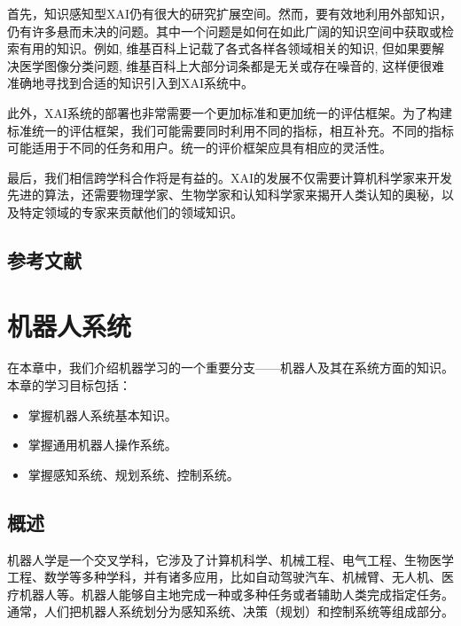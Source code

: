 \documentclass[letterpaper,10pt,english]{sphinxmanual}
\begin{document}
\sphinxAtStartPar
首先，知识感知型XAI仍有很大的研究扩展空间。然而，要有效地利用外部知识，仍有许多悬而未决的问题。其中一个问题是如何在如此广阔的知识空间中获取或检索有用的知识。例如,
维基百科上记载了各式各样各领域相关的知识, 但如果要解决医学图像分类问题,
维基百科上大部分词条都是无关或存在噪音的,
这样便很难准确地寻找到合适的知识引入到XAI系统中。

\sphinxAtStartPar
此外，XAI系统的部署也非常需要一个更加标准和更加统一的评估框架。为了构建标准统一的评估框架，我们可能需要同时利用不同的指标，相互补充。不同的指标可能适用于不同的任务和用户。统一的评价框架应具有相应的灵活性。

\sphinxAtStartPar
最后，我们相信跨学科合作将是有益的。XAI的发展不仅需要计算机科学家来开发先进的算法，还需要物理学家、生物学家和认知科学家来揭开人类认知的奥秘，以及特定领域的专家来贡献他们的领域知识。


\section{参考文献}
\label{\detokenize{chapter_explainable_AI/explainable_ai:id22}}
\sphinxAtStartPar



\chapter{机器人系统}
\label{\detokenize{chapter_rl_sys/index:id1}}\label{\detokenize{chapter_rl_sys/index::doc}}
\sphinxAtStartPar
在本章中，我们介绍机器学习的一个重要分支——机器人及其在系统方面的知识。本章的学习目标包括：
\begin{itemize}
\item {} 
\sphinxAtStartPar
掌握机器人系统基本知识。

\item {} 
\sphinxAtStartPar
掌握通用机器人操作系统。

\item {} 
\sphinxAtStartPar
掌握感知系统、规划系统、控制系统。

\end{itemize}


\section{概述}
\label{\detokenize{chapter_rl_sys/rl_sys_intro:id1}}\label{\detokenize{chapter_rl_sys/rl_sys_intro::doc}}
\sphinxAtStartPar
机器人学是一个交叉学科，它涉及了计算机科学、机械工程、电气工程、生物医学工程、数学等多种学科，并有诸多应用，比如自动驾驶汽车、机械臂、无人机、医疗机器人等。机器人能够自主地完成一种或多种任务或者辅助人类完成指定任务。通常，人们把机器人系统划分为感知系统、决策（规划）和控制系统等组成部分。
\end{document}
